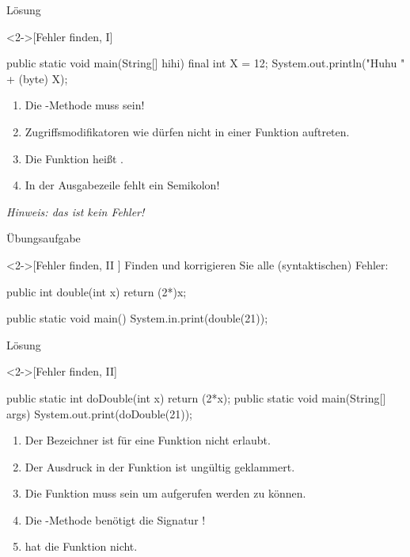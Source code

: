 \begin{frame}[c,fragile]{Lösung}
    \begin{solve}<2->[Fehler finden, I]
        \pause{}\begin{plainjava}
public static void main(String[] hihi) {
    final int X = 12;
    System.out.println("Huhu " + (byte) X);
}
        \end{plainjava}
    \begin{enumerate}[<+(1)->]
        \item Die -Methode muss  sein!
        \item Zugriffsmodifikatoren wie  dürfen nicht in einer Funktion auftreten.
        \item Die Funktion  heißt .
        \item In der Ausgabezeile fehlt ein Semikolon!
    \end{enumerate}
    \pause{}\textit{Hinweis: das  ist kein Fehler!}
    \end{solve}
\end{frame}

\begin{frame}[c,fragile]{Übungsaufgabe}
    \begin{exercise}<2->[Fehler finden, II ]
        \pause{}Finden und korrigieren Sie alle (syntaktischen) Fehler:\pause{}
        \begin{plainvoid}
public int double(int x) { return (2*)x; }

public static void main() {
    System.in.print(double(21));
}
        \end{plainvoid}
    \end{exercise}
\end{frame}

\begin{frame}[c,fragile]{Lösung}
    \begin{solve}<2->[Fehler finden, II]
        \pause{}\begin{plainjava}
public static int doDouble(int x) { return (2*x); }
public static void main(String[] args) {
    System.out.print(doDouble(21));
}
        \end{plainjava}
    \begin{enumerate}[<+(1)->]
        \item Der Bezeichner  ist für eine Funktion nicht erlaubt.
        \item Der Ausdruck in der Funktion ist ungültig geklammert.
        \item Die Funktion muss  sein um aufgerufen werden zu können.
        \item Die -Methode benötigt die Signatur !
        \item {} hat die Funktion  nicht.
    \end{enumerate}
    \end{solve}
\end{frame}

